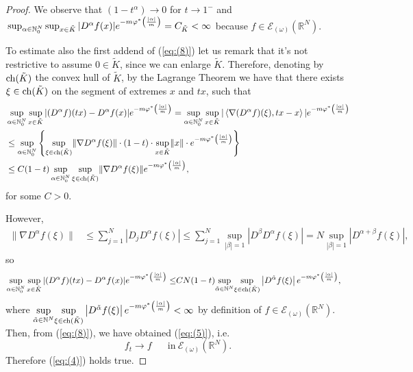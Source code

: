 \documentclass[twoside]{amsart}
\begin{document}
\begin{proof}
We observe that $(1-t^{\alpha})\rightarrow0$ for $t\rightarrow1^{-}$
and
${\displaystyle}\sup_{\alpha\in{\mathbb N}_0^N}\sup_{x\in\tilde K}
|D^{\alpha}f(x)| e^{-m\varphi^{*}\left(\frac{|\alpha|}{m}\right)}=C_{\tilde{K}}<\infty$
because $f\in{\mathcal{E}}_{(\omega)}({\mathbb R}^N)$.

To estimate also the first addend of (\ref{eq:(8)}) let us remark
that it's not restrictive to assume $0\in\tilde{K}$, since we can
enlarge $\tilde{K}$. Therefore, denoting by ${\mathop{\rm ch}\nolimits}(\tilde{K})$ the
convex hull of $\tilde{K}$, by the Lagrange Theorem we have that
there exists $\xi\in{\mathop{\rm ch}\nolimits}(\tilde{K})$ on the segment of extremes
$x$ and $tx$, such that 
\begin{align*}
 &\sup_{\alpha\in{\mathbb N}_0^N}\sup_{x\in\tilde K}
  |(D^{\alpha}f)(tx)-D^{\alpha}f(x)|e^{-m\varphi^{*}\left(\frac{|\alpha|}{m}\right)} 
  =\sup_{\alpha\in{\mathbb N}_0^N}\sup_{x\in\tilde K}
  |\left\langle
  \nabla(D^{\alpha}f)(\xi),tx-x\right\rangle
  |e^{-m\varphi^{*}\left(\frac{|\alpha|}{m}\right)}\\
  & \leq \sup_{\alpha\in{\mathbb N}_0^N}
  \left\{ \underset{\xi
    \in{\mathop{\rm ch}\nolimits}(\tilde{K})}{\sup}\|\nabla D^{\alpha}f(\xi)\|
  \cdot(1-t)\cdot\underset{x\in\tilde{K}}{\sup}\|x\|\cdot
  e^{-m\varphi^{*}\left(\frac{|\alpha|}{m}\right)}\right\} \\
  & \leq C(1-t)\sup_{\alpha\in{\mathbb N}_0^N}
  \underset{\xi\in{\mathop{\rm ch}\nolimits}(\tilde{K})}{\sup}
  \|\nabla D^{\alpha}f(\xi)\|
  e^{-m\varphi^{*}\left(\frac{|\alpha|}{m}\right)},
\end{align*}
for some $C>0$.

However,
\begin{align*}
  \|\nabla D^{\alpha}f(\xi)\| & \leq\sum_{j=1}^{N}
  \left|D_{j}D^{\alpha}f(\xi)\right|
   \leq\sum_{j=1}^{N}\underset{|\beta|=1}{\sup}
  \left|D^{\beta}D^{\alpha}f(\xi)\right|
  =N\underset{|\beta|=1}{\sup}\left|D^{\alpha+\beta}f(\xi)\right|,
\end{align*}
so
\begin{align*}
  \sup_{\alpha\in{\mathbb N}_0^N}\sup_{x\in\tilde K}
  |(D^{\alpha}f)(tx)-D^{\alpha}f(x)|e^{-m\varphi^{*}\left(\frac{|\alpha|}{m}\right)}
  \leq & CN(1-t)\underset{\tilde{\alpha}\in{\mathbb N}^{N}}{\sup}
  \underset{\xi\in{\mathop{\rm ch}\nolimits}(\tilde{K})}{\sup}\left|D^{\tilde{\alpha}}f(\xi)\right|
  e^{-m\varphi^{*}\left(\frac{|\alpha|}{m}\right)},
\end{align*}
where
$\underset{\tilde{\alpha}\in{\mathbb N}^{N}}{\sup}
\underset{\xi\in{\mathop{\rm ch}\nolimits}(\tilde{K})}{\sup}
\left|D^{\tilde{\alpha}}f(\xi)\right|e^{-m\varphi^{*}\left(\frac{|\alpha|}{m}\right)}<\infty$
by definition of $f\in{\mathcal{E}}_{(\omega)}({\mathbb R}^N)$. Then, from (\ref{eq:(8)}), we have
obtained (\ref{eq:(5)}), i.e. 
\[
f_{t}\rightarrow f\,\,\,\,\,\,\,\,\,\,\mbox{in}\ {\mathcal{E}}_{(\omega)}({\mathbb R}^N).
\]
Therefore (\ref{eq:(4)}) holds true.


\end{proof}
\end{document}
